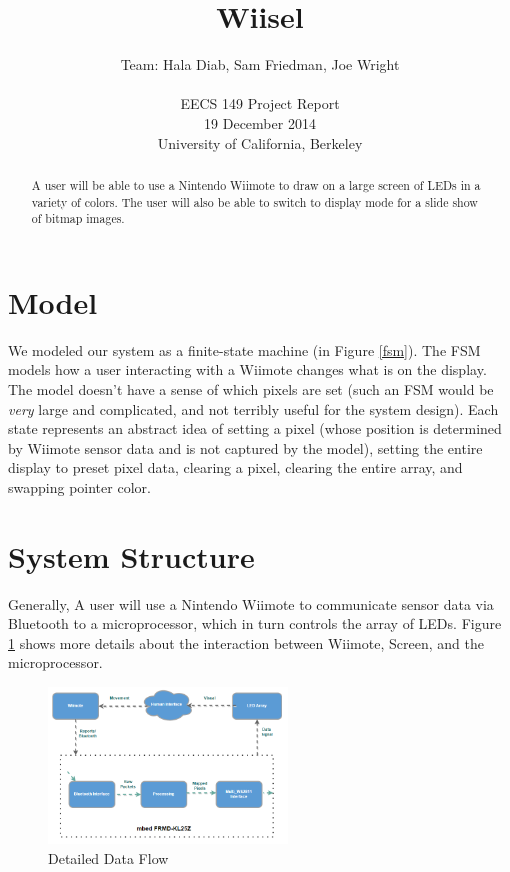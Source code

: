 \documentclass[10pt,twocolumn]{article}
\title{Wiisel}
\author{Team: Hala Diab, Sam Friedman, Joe Wright\\
\\
EECS 149 Project Report\\
19 December 2014\\
University of California, Berkeley}
\begin{document}
\maketitle
\thispagestyle{empty}
\begin{abstract}
    A user will be able to use a Nintendo Wiimote to draw on a large screen of
LEDs in a variety of colors. The user will also be able to switch to display mode for a slide show of bitmap images.
\end{abstract}

\section{Model}
We modeled our system as a finite-state machine (in Figure \ref{fsm}). The FSM
models how a user interacting with a Wiimote changes what is on the display.
The model doesn't have a sense of which pixels are set (such an FSM would be
\textit{very} large and complicated, and not terribly useful for the system
design). Each state represents an abstract idea of setting a pixel (whose
position is determined by Wiimote sensor data and is not captured by the
model), setting the entire display to preset pixel data, clearing a pixel,
clearing the entire array, and swapping pointer color.

\section{\textbf{System Structure}}

Generally, A user will use a Nintendo Wiimote to communicate sensor data via
Bluetooth to a microprocessor, which in turn controls the array of LEDs. 
Figure \ref{detailed-data-flow} shows more details about the interaction between Wiimote, Screen, and the microprocessor.
\begin{figure}[H]
    \includegraphics[trim=3cm 0cm 4cm 0cm, width=2.5in]{dataflow1.png}
    \caption{Detailed Data Flow}
    \label{detailed-data-flow}
\end{figure}
\end{document}
